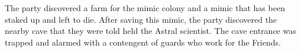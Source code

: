 The party discovered a farm for the mimic colony and a mimic that has been staked up and left to die.
After saving this mimic, the party discovered the nearby cave that they were told held the Astral scientist.
The cave entrance was trapped and alarmed with a contengent of guards who work for the Friends.
